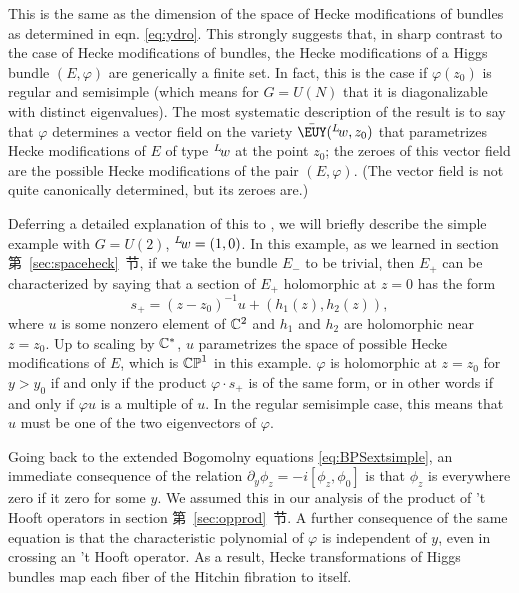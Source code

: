 This is the same as the dimension of the space of Hecke
modifications of bundles as determined in eqn. \eqref{eq:ydro}.  This
strongly suggests that, in sharp contrast to the case of Hecke
modifications of bundles, the Hecke modifications of a Higgs
bundle $(E,\varphi)$ are generically a finite set.  In fact, this
is the case if $\varphi(z_0)$ is regular and semisimple (which
means for $G=U(N)$ that it is diagonalizable with distinct
eigenvalues). The most systematic description of the result is to
say that $\varphi$ determines a vector field on the variety $\bar
{\EUY}({}^L\negthinspace w,z_0)$ that parametrizes Hecke
modifications of $E$ of type $^L\negthinspace w$ at the point
$z_0$; the zeroes of this vector field are the possible Hecke
modifications of the pair $(E,\varphi)$. (The vector field is not
quite canonically determined, but its zeroes are.)

Deferring a detailed explanation of this to \cite{ref26}, we will
briefly describe the simple example with $G=U(2)$,
$^L\negthinspace w=(1,0)$. In this example, as we learned in
section 第~\ref{sec:spaceheck}~节, if we take the bundle $E_-$ to be trivial,
then $E_+$ can be characterized by saying that a section of $E_+$
holomorphic at $z=0$ has the form %
\setcounter{equation}{39}
\begin{equation}\label{eq:hxonxno}
s_+=(z-z_0)^{-1}
u+(h_1(z),h_2(z)),
\end{equation}
  where $u$ is some nonzero element of
$\Bbb{C}^2$ and $h_1$ and $h_2$ are holomorphic near $z=z_0$.  Up
to scaling by $\Bbb{C}^*$, $u$ parametrizes the space of possible
Hecke modifications of $E$, which is $\Bbb{CP}^1$ in this example.
$\varphi$ is holomorphic at $z=z_0$  for $y>y_0$ if and only if
the product $\varphi\cdot s_+$ is of the same form, or in other
words if and only if $\varphi u$ is a multiple of $u$. In the
regular semisimple case, this means that $u$ must be one of the
two eigenvectors of $\varphi$.

Going back to the extended Bogomolny equations \eqref{eq:BPSextsimple}, an
immediate consequence of the relation
$\partial_y\phi_z=-i[\phi_z,\phi_0]$ is that $\phi_z$ is
everywhere zero if it zero for some $y$.  We assumed this in our
analysis of the product of 't Hooft operators in section 第~\ref{sec:opprod}~节.
A further consequence of the same equation is that the
characteristic polynomial of $\varphi$ is independent of $y$, even
in crossing an 't Hooft operator.  As a result, Hecke
transformations of Higgs bundles map each fiber of the Hitchin
fibration to itself.

